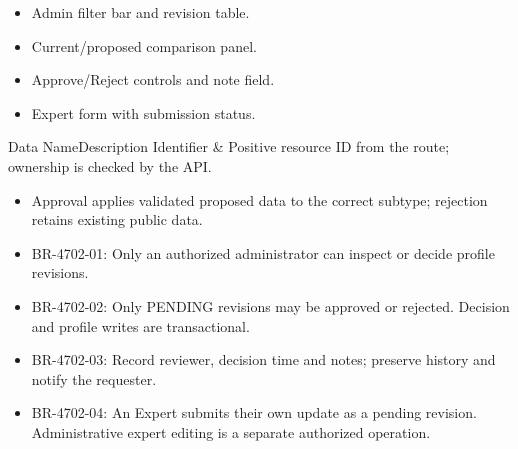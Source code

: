 \begin{itemize}[leftmargin=1.6em,topsep=3pt,itemsep=2pt,parsep=0pt,label=$\bullet$]
    \item Admin filter bar and revision table.
    \item Current/proposed comparison panel.
    \item Approve/Reject controls and note field.
    \item Expert form with submission status.
\end{itemize}


\begin{specdatatable}{Data Name}{Description}
Identifier & Positive resource ID from the route; ownership is checked by the API.\\ \hline
\end{specdatatable}

\begin{itemize}[leftmargin=1.6em,topsep=3pt,itemsep=2pt,parsep=0pt,label=$\bullet$]
    \item Approval applies validated proposed data to the correct subtype; rejection retains existing public data.
\end{itemize}

\begin{itemize}[leftmargin=1.6em,topsep=3pt,itemsep=2pt,parsep=0pt,label=$\bullet$]\brrulelist
    \item BR-4702-01: Only an authorized administrator can inspect or decide profile revisions.
    \item BR-4702-02: Only PENDING revisions may be approved or rejected. Decision and profile writes are transactional.
    \item BR-4702-03: Record reviewer, decision time and notes; preserve history and notify the requester.
    \item BR-4702-04: An Expert submits their own update as a pending revision. Administrative expert editing is a separate authorized operation.
\end{itemize}

